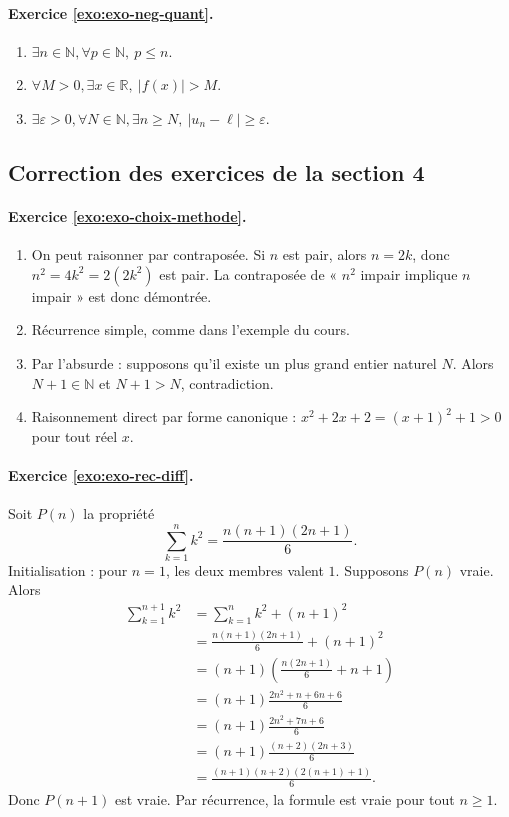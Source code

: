 \documentclass[11pt,a4paper]{article}
\newcommand{\R}{\mathbb{R}}
\newcommand{\N}{\mathbb{N}}
\begin{document}
\paragraph{Exercice \ref{exo:exo-neg-quant}.}
\begin{enumerate}
  \item $\exists n\in\N,\forall p\in\N,\ p\leq n$.
  \item $\forall M>0,\exists x\in\R,\ |f(x)|>M$.
  \item $\exists \varepsilon>0,\forall N\in\N,\exists n\geq N,\ |u_n-\ell|\geq\varepsilon$.
\end{enumerate}

\subsection*{Correction des exercices de la section 4}

\paragraph{Exercice \ref{exo:exo-choix-methode}.}
\begin{enumerate}
  \item On peut raisonner par contraposée. Si $n$ est pair, alors $n=2k$, donc $n^2=4k^2=2(2k^2)$ est pair. La contraposée de « $n^2$ impair implique $n$ impair » est donc démontrée.
  \item Récurrence simple, comme dans l'exemple du cours.
  \item Par l'absurde : supposons qu'il existe un plus grand entier naturel $N$. Alors $N+1\in\N$ et $N+1>N$, contradiction.
  \item Raisonnement direct par forme canonique : $x^2+2x+2=(x+1)^2+1>0$ pour tout réel $x$.
\end{enumerate}

\paragraph{Exercice \ref{exo:exo-rec-diff}.}
Soit $P(n)$ la propriété
\[
\sum_{k=1}^n k^2=\frac{n(n+1)(2n+1)}6.
\]
Initialisation : pour $n=1$, les deux membres valent $1$.
Supposons $P(n)$ vraie. Alors
\begin{align*}
\sum_{k=1}^{n+1}k^2
&=\sum_{k=1}^n k^2+(n+1)^2\\
&=\frac{n(n+1)(2n+1)}6+(n+1)^2\\
&=(n+1)\left(\frac{n(2n+1)}6+n+1\right)\\
&=(n+1)\frac{2n^2+n+6n+6}{6}\\
&=(n+1)\frac{2n^2+7n+6}{6}\\
&=(n+1)\frac{(n+2)(2n+3)}6\\
&=\frac{(n+1)(n+2)(2(n+1)+1)}6.
\end{align*}
Donc $P(n+1)$ est vraie. Par récurrence, la formule est vraie pour tout $n\geq1$.
\end{document}

